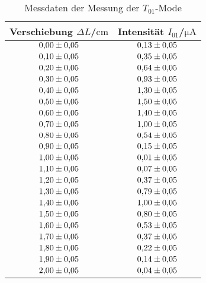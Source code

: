 \begin{table}
 \caption{Messdaten der Messung der $T_{01}$-Mode}
 \label{tab:t01}
 \centering
{} \begin{tabular}{SS}
 \toprule 
    {Verschiebung $\Delta L$/$\si{\centi\meter}$}& {Intensität $I_{\mathrm{01}}$/$\si{\micro\ampere}$} \\
     \midrule
     $\num{0.00 \pm 0.05}$ & $\num{0.13\pm0.05}$ \\
     $\num{0.10 \pm 0.05}$ & $\num{0.35\pm0.05}$ \\
     $\num{0.20 \pm 0.05}$ & $\num{0.64\pm0.05}$ \\
     $\num{0.30 \pm 0.05}$ & $\num{0.93\pm0.05}$ \\
     $\num{0.40 \pm 0.05}$ & $\num{1.30\pm0.05}$ \\
     $\num{0.50 \pm 0.05}$ & $\num{1.50\pm0.05}$ \\
     $\num{0.60 \pm 0.05}$ & $\num{1.40\pm0.05}$ \\
     $\num{0.70 \pm 0.05}$ & $\num{1.00\pm0.05}$ \\
     $\num{0.80 \pm 0.05}$ & $\num{0.54\pm0.05}$ \\
     $\num{0.90 \pm 0.05}$ & $\num{0.15\pm0.05}$ \\
     $\num{1.00 \pm 0.05}$ & $\num{0.01\pm0.05}$ \\
     $\num{1.10 \pm 0.05}$ & $\num{0.07\pm0.05}$ \\
     $\num{1.20 \pm 0.05}$ & $\num{0.37\pm0.05}$ \\
     $\num{1.30 \pm 0.05}$ & $\num{0.79\pm0.05}$ \\
     $\num{1.40 \pm 0.05}$ & $\num{1.00\pm0.05}$ \\
     $\num{1.50 \pm 0.05}$ & $\num{0.80\pm0.05}$ \\
     $\num{1.60 \pm 0.05}$ & $\num{0.53\pm0.05}$ \\
     $\num{1.70 \pm 0.05}$ & $\num{0.37\pm0.05}$ \\
     $\num{1.80 \pm 0.05}$ & $\num{0.22\pm0.05}$ \\
     $\num{1.90 \pm 0.05}$ & $\num{0.14\pm0.05}$ \\
     $\num{2.00 \pm 0.05}$ & $\num{0.04\pm0.05}$ \\
 \bottomrule
 \end{tabular}
\end{table}